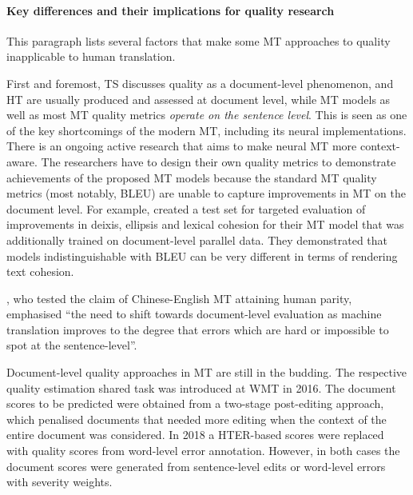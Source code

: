 \paragraph{\label{par:diffs}Key differences and their implications for quality research} %
This paragraph lists several factors that make some MT approaches to quality inapplicable to human translation. 

First and foremost, TS discusses quality as a document-level phenomenon, and HT are usually produced and assessed at document level, while MT models as well as most MT quality metrics \textit{operate on the sentence level}.
This is seen as one of the key shortcomings of the modern MT, including its neural implementations. There is an ongoing active research that aims to make neural MT more context-aware. The researchers have to design their own quality metrics to demonstrate achievements of the proposed MT models because the standard MT quality metrics (most notably, \gls{BLEU}) are unable to capture improvements in MT on the document level. For example, \citet{Voita2019} created a test set for targeted evaluation of improvements in deixis, ellipsis and lexical cohesion for their MT model that was additionally trained on document-level parallel data. They demonstrated that models indistinguishable with BLEU can be very different in terms of rendering text cohesion.

\citet[p.4791]{Laubli2018}, who tested the claim of Chinese-English MT attaining human parity, emphasised ``the need to shift towards document-level evaluation as machine translation improves to the degree that errors which are hard or impossible to spot at the sentence-level''. 

Document-level quality approaches in MT are still in the budding. The respective quality estimation shared task was introduced at \gls{WMT} in 2016. The document scores to be predicted were obtained from a two-stage post-editing approach, which penalised documents that needed more editing when the context of the entire document was considered. 
In 2018 a HTER-based scores were replaced with quality scores from word-level error annotation. However, in both cases the document scores were generated from sentence-level edits or word-level errors with severity weights.
 
